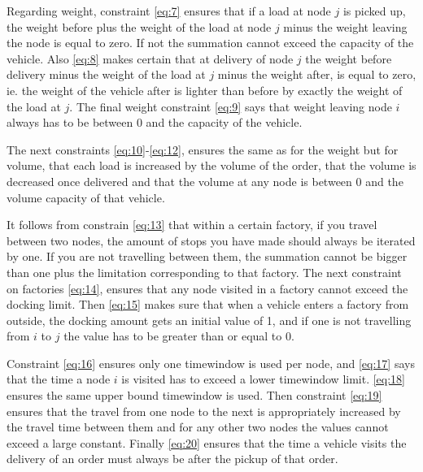 \documentclass[a4paper,10pt]{article}
\begin{document}
Regarding weight, constraint \ref{eq:7} ensures that if a load at node $j$ is picked up, the weight before plus the weight of the load at node $j$ minus the weight leaving the node is equal to zero. If not the summation cannot exceed the capacity of the vehicle.
Also \ref{eq:8} makes certain that at delivery of node $j$ the weight before delivery minus the weight of the load at $j$ minus the weight after, is equal to zero, ie. the weight of the vehicle after is lighter than before by exactly the weight of the load at $j$. 
The final weight constraint \ref{eq:9} says that weight leaving node $i$ always has to be between $0$ and the capacity of the vehicle. \par

The next constraints \ref{eq:10}-\ref{eq:12}, ensures the same as for the weight but for volume, that each load is increased by the volume of the order, that the volume is decreased once delivered and that the volume at any node is between $0$ and the volume capacity of that vehicle.

It follows from constrain \ref{eq:13} that within a certain factory, if you travel between two nodes, the amount of stops you have made should always be iterated by one. 
If you are not travelling between them, the summation cannot be bigger than one plus the limitation corresponding to that factory.
The next constraint on factories \ref{eq:14}, ensures that any node visited in a factory cannot exceed the docking limit.
Then \ref{eq:15} makes sure that when a vehicle enters a factory from outside, the docking amount gets an initial value of 1, and if one is not travelling from $i$ to $j$ the value has to be greater than or equal to 0. \par

Constraint \ref{eq:16} ensures only one timewindow is used per node, and \ref{eq:17} says that the time a node $i$ is visited has to exceed a lower timewindow limit.
\ref{eq:18} ensures the same upper bound timewindow is used. 
Then constraint \ref{eq:19} ensures that the travel from one node to the next is appropriately increased by the travel time between them and for any other two nodes the values cannot exceed a large constant.
Finally \ref{eq:20} ensures that the time a vehicle visits the delivery of an order must always be after the pickup of that order. \par
\end{document}
